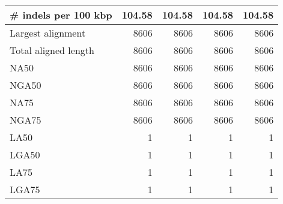 \documentclass[12pt,a4paper]{article}
\begin{document}
\begin{table}[ht]
\begin{center}
\begin{tabular}{|l*{4}{|r}|}
\# indels per 100 kbp & 104.58 & 104.58 & 104.58 & 104.58 \\ \hline
Largest alignment & 8606 & 8606 & 8606 & 8606 \\ \hline
Total aligned length & 8606 & 8606 & 8606 & 8606 \\ \hline
NA50 & 8606 & 8606 & 8606 & 8606 \\ \hline
NGA50 & 8606 & 8606 & 8606 & 8606 \\ \hline
NA75 & 8606 & 8606 & 8606 & 8606 \\ \hline
NGA75 & 8606 & 8606 & 8606 & 8606 \\ \hline
LA50 & 1 & 1 & 1 & 1 \\ \hline
LGA50 & 1 & 1 & 1 & 1 \\ \hline
LA75 & 1 & 1 & 1 & 1 \\ \hline
LGA75 & 1 & 1 & 1 & 1 \\ \hline
\end{tabular}
\end{center}
\end{table}
\end{document}
